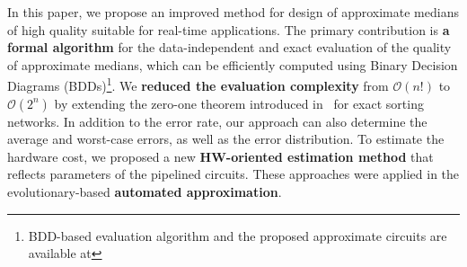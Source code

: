 In this paper, we propose an improved method for design of approximate medians of high quality suitable for real-time applications.
The primary contribution is \textbf{a formal algorithm} for the data-independent and exact evaluation of the quality of approximate medians, which can be efficiently computed using Binary Decision Diagrams (BDDs)\footnote{BDD-based evaluation algorithm and the proposed approximate circuits are available at \repository}.
We \textbf{reduced the evaluation complexity} from $\mathcal{O}(n!)$ to $\mathcal{O}(2^n)$ by extending the zero-one theorem introduced in~\cite{Knuth:ACP} for exact sorting networks. 
In addition to the error rate, our approach can also determine the average and worst-case errors, as well as the error distribution. %
To estimate the hardware cost, we proposed a new \textbf{HW-oriented estimation method} that reflects parameters of the pipelined circuits.
These approaches were applied in the evolutionary-based \textbf{automated approximation}.